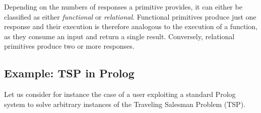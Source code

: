 \documentclass[12pt,a4paper,openright,twoside]{book}
\begin{document}
Depending on the numbers of responses a primitive provides, it can either be classified as either \emph{functional} or \emph{relational}.
%
Functional primitives produce just one response and their execution is therefore analogous to the execution of a function, as they consume an input and return a single result.
%
Conversely, relational primitives produce two or more responses.

\subsection{Example: TSP in Prolog}\label{ssec:tsp}

Let us consider for instance the case of a user exploiting a standard Prolog system to solve arbitrary instances of the Traveling Salesman Problem (TSP).
\end{document}
